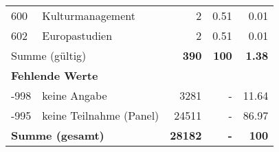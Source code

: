 \begin{longtable}{lXrrr}
        600 & \multicolumn{1}{X}{Kulturmanagement} & %
          \num{2} &
          \num[round-mode=places,round-precision=2]{0.51} &
          \num[round-mode=places,round-precision=2]{0.01} \\

        602 & \multicolumn{1}{X}{Europastudien} & %
          \num{2} &
          \num[round-mode=places,round-precision=2]{0.51} &
          \num[round-mode=places,round-precision=2]{0.01} \\

     \midrule
     \multicolumn{2}{l}{Summe (gültig)} &
       \textbf{\num{390}} &
     \textbf{\num{100}} &
       \textbf{\num[round-mode=places,round-precision=2]{1.38}} \\
     \multicolumn{5}{l}{\textbf{Fehlende Werte}}\\
       -998 &
       keine Angabe &
         \num{3281} &
        - &
         \num[round-mode=places,round-precision=2]{11.64} \\
       -995 &
       keine Teilnahme (Panel) &
         \num{24511} &
        - &
         \num[round-mode=places,round-precision=2]{86.97} \\
     \midrule
     \multicolumn{2}{l}{\textbf{Summe (gesamt)}} &
          \textbf{\num{28182}} &
        \textbf{-} &
        \textbf{\num{100}} \\
     \bottomrule
     \end{longtable}
     
